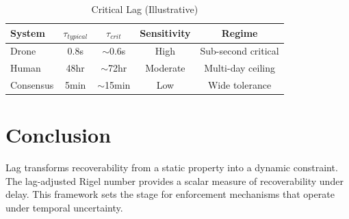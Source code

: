 \documentclass[letterpaper, 10 pt, conference]{ieeeconf}
\begin{document}
\begin{table}[h]
\centering
\caption{Critical Lag (Illustrative)}
\begin{tabular}{lcccc}
System & $\tau_{typical}$ & $\tau_{crit}$ & Sensitivity & Regime \\
\hline
Drone & 0.8s & $\sim$0.6s & High & Sub-second critical \\
Human & 48hr & $\sim$72hr & Moderate & Multi-day ceiling \\
Consensus & 5min & $\sim$15min & Low & Wide tolerance \\
\end{tabular}
\end{table}

\section{Conclusion}

Lag transforms recoverability from a static property into a dynamic constraint. The lag-adjusted Rigel number provides a scalar measure of recoverability under delay. This framework sets the stage for enforcement mechanisms that operate under temporal uncertainty.
\end{document}

